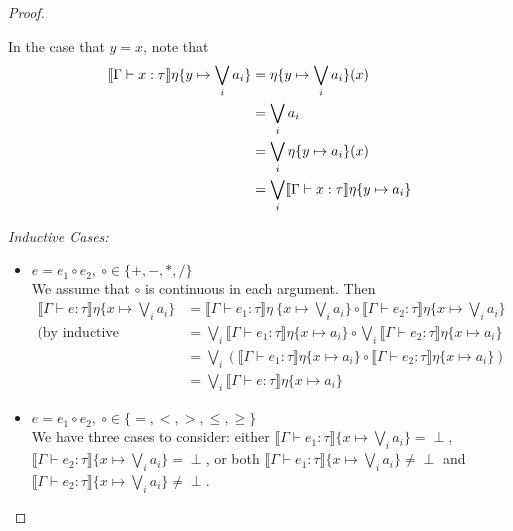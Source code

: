 \begin{proof}
\begin{itemize}
 In the case that $y = x$, note that
  \begin{align*}
  \llbracket \Gamma \vdash x : \tau \rrbracket\eta\{y\mapsto\bigvee_i a_i\} &= \eta\{y\mapsto \bigvee_i a_i\}(x) \\
  &= \bigvee_i a_i \\
  &=\bigvee_i \eta\{y \mapsto a_i\}(x)  \\
  &= \bigvee_i\llbracket{{\Gamma}\vdash{x}:{\tau}}\rrbracket{\eta\{{y}\mapsto{a_i}\}}
  \end{align*}
 \end{itemize}
 \emph{Inductive Cases: }
 \begin{itemize}
 \item $e = e_1 \circ e_2, \ \circ \in \{+, -, *, / \}$ \\
 We assume that $\circ$ is continuous in each argument. Then 
 \begin{align*}
 \llbracket \Gamma \vdash e : \tau \rrbracket\eta\{x \mapsto \bigvee_i a_i\} &= \llbracket \Gamma\vdash e_1 : \tau 
 \rrbracket\eta\ \{x \mapsto \bigvee_i a_i\} \circ \llbracket \Gamma \vdash e_2 : \tau \rrbracket\eta\{x \mapsto \bigvee_i a_i\}\\
  \text{(by inductive hypothesis)} &=  \bigvee_i\llbracket \Gamma \vdash e_1: \tau \rrbracket\eta\{x\mapsto a_i\} \circ
  \bigvee_i\llbracket \Gamma \vdash e_2: \tau \rrbracket\eta\{x\mapsto a_i\}  \\
  &= \bigvee_i(\llbracket \Gamma \vdash e_1: \tau \rrbracket\eta\{x\mapsto a_i\} \circ 
  \llbracket \Gamma \vdash e_2: \tau \rrbracket\eta\{x\mapsto a_i\}) \\
  &= \bigvee_i \llbracket \Gamma \vdash e: \tau \rrbracket\eta\{x\mapsto a_i\}
 \end{align*}

  \item $e = e_1 \circ e_2, \ \circ \in \{=,<,>,\leq,\geq\}$\\ 
  We have three cases to consider: either $\llbracket \Gamma \vdash e_1:\tau\rrbracket\{x\mapsto \bigvee_i a_i\} = 
  \perp$,  $\llbracket \Gamma \vdash e_2:\tau\rrbracket\{x\mapsto \bigvee_i a_i\} = \perp$, or both 
  $\llbracket \Gamma \vdash e_1:\tau\rrbracket\{x\mapsto \bigvee_i a_i\} \neq \perp$ and 
  $\llbracket \Gamma \vdash e_2:\tau\rrbracket\{x\mapsto \bigvee_i a_i\} \neq \perp$.
  

\end{itemize}
\end{proof}
